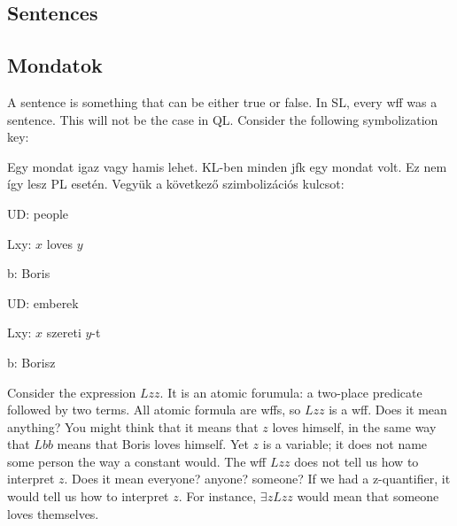 


\subsection*{Sentences}
\subsection{Mondatok}

A {sentence} is something that can be either true or false. In SL, every wff was a sentence. This will not be the case in QL. Consider the following symbolization key:

Egy mondat igaz vagy hamis lehet. KL-ben minden jfk egy mondat volt. Ez nem így lesz PL esetén. Vegyük a következő szimbolizációs kulcsot:

\begin{ekey}
\item[UD:] people
\item[Lxy:] $x$ loves $y$
\item[b:] Boris
\end{ekey}

\begin{ekey}
\item[UD:] emberek
\item[Lxy:] $x$ szereti $y$-t
\item[b:] Borisz
\end{ekey}

Consider the expression $Lzz$. It is an atomic forumula: a two-place predicate followed by two terms. All atomic formula are wffs, so $Lzz$ is a wff. Does it mean anything? You might think that it means that $z$ loves himself, in the same way that $Lbb$ means that Boris loves himself. Yet $z$ is a variable; it does not name some person the way a constant would. The wff $Lzz$ does not tell us how to interpret $z$. Does it mean everyone? anyone? someone? If we had a z-quantifier, it would tell us how to interpret $z$. For instance, $\exists zLzz$ would mean that someone loves themselves.


